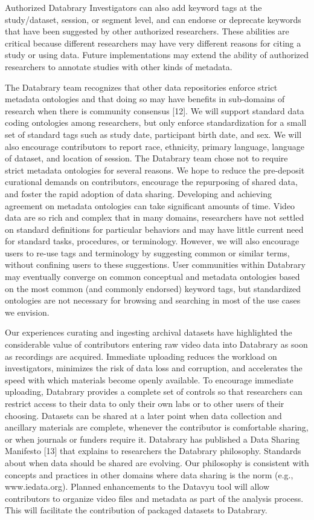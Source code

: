 \documentclass[letterpaper,man,apacite]{apa6}
\begin{document}
Authorized Databrary Investigators can also add keyword tags at the study/dataset, session, or segment level, and can endorse or deprecate keywords that have been suggested by other authorized researchers. These
abilities are critical because different researchers may have very different reasons for citing a study or using data. Future implementations may extend the ability of authorized researchers to
annotate studies with other kinds of metadata.

The Databrary team recognizes that other data repositories enforce strict metadata ontologies and that doing so may have benefits in sub-domains of research when there is community consensus [12]. 
We will support standard data coding ontologies among researchers, but only enforce standardization for a small set of standard tags such as study date, participant birth date, and sex. We will also encourage
contributors to report race, ethnicity, primary language, language of
dataset, and location of session. 
The Databrary team chose not to require strict metadata ontologies for several reasons. We hope to
reduce the pre-deposit curational demands on contributors, encourage the repurposing of shared data, and foster the rapid adoption of data sharing. 
Developing and achieving agreement on metadata ontologies can take significant amounts of time. 
Video data are so rich and complex that in many domains, researchers have not settled on standard definitions for particular behaviors and may have little current need for standard tasks, procedures, or terminology. 
However, we will also encourage users to re-use tags and terminology by suggesting common or similar terms, without confining users to these suggestions. 
User communities within Databrary may eventually converge on common conceptual and metadata ontologies based on the most common (and commonly endorsed) keyword tags, but standardized ontologies are not
necessary for browsing and searching in most of the use cases we
envision.

Our experiences curating and ingesting archival datasets have highlighted the considerable value of contributors entering raw video data into Databrary as soon as recordings are acquired. 
Immediate uploading reduces the workload on investigators, minimizes the risk of
data loss and corruption, and accelerates the speed with which materials
become openly available. 
To encourage immediate uploading, Databrary provides a complete set of controls so that researchers can restrict
access to their data to only their own labs or to other users of their
choosing. 
Datasets can be shared at a later point when data collection and ancillary materials are complete, whenever the contributor is comfortable sharing, or when journals or funders require it. 
Databrary has published a Data Sharing Manifesto [13] that explains to researchers the Databrary philosophy. Standards about when data should be shared are evolving. 
Our philosophy is consistent with concepts and practices in other domains where data sharing is the norm (e.g., www.iedata.org).
Planned enhancements to the Datavyu tool will allow contributors to organize video files and metadata as part of the analysis process. 
This will facilitate the contribution of packaged datasets to Databrary.
\end{document}
